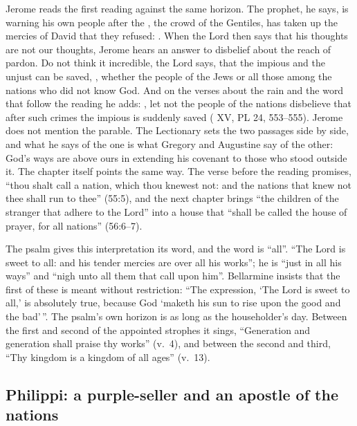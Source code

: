 Jerome reads the first reading against the same horizon. The prophet, he says,
is warning his own people after the , the crowd of the
Gentiles, has taken up the mercies of David that they refused: . When the Lord then says that his thoughts are
not our thoughts, Jerome hears an answer to disbelief about the reach of
pardon. Do not think it incredible, the Lord says, that the impious and the
unjust can be saved, , whether the people of the Jews or all those among the
nations who did not know God. And on the verses about the rain and the word
that follow the reading he adds: ,
let not the people of the nations disbelieve that after such crimes the impious
is suddenly saved ( XV, PL 24, 553--555). Jerome does not
mention the parable. The Lectionary sets the two passages side by side, and
what he says of the one is what Gregory and Augustine say of the other: God's
ways are above ours in extending his covenant to those who stood outside it.
The chapter itself points the same way. The verse before the reading
promises, ``thou shalt call a nation, which thou knewest not: and the nations
that knew not thee shall run to thee'' (55:5), and the next chapter brings
``the children of the stranger that adhere to the Lord'' into a house that
``shall be called the house of prayer, for all nations'' (56:6--7).

The psalm gives this interpretation its word, and the word is ``all''. ``The Lord is
sweet to all: and his tender mercies are over all his works''; he is ``just
in all his ways'' and ``nigh unto all them that call upon him''. Bellarmine
insists that the first of these is meant without restriction: ``The
expression, `The Lord is sweet to all,' is absolutely true, because God
`maketh his sun to rise upon the good and the bad'\,''. The psalm's own horizon
is as long as the householder's day. Between the first and second of the
appointed strophes it sings, ``Generation and generation shall praise thy
works'' (v.~4), and between the second and third, ``Thy kingdom is a kingdom
of all ages'' (v.~13).

\subsection{Philippi: a purple-seller and an apostle of the nations}

